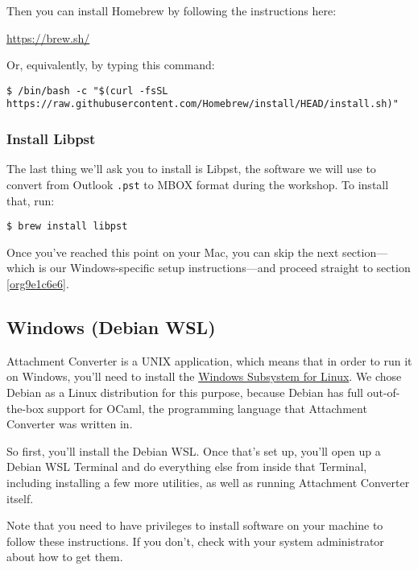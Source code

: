 \documentclass[11pt]{article}
\begin{document}
Then you can install Homebrew by following the instructions here:

\url{https://brew.sh/}

Or, equivalently, by typing this command:

\footnotesize

\begin{verbatim}
$ /bin/bash -c "$(curl -fsSL https://raw.githubusercontent.com/Homebrew/install/HEAD/install.sh)"
\end{verbatim}

\normalsize

\subsubsection{Install Libpst}
\label{sec:org3cbbe03}

The last thing we'll ask you to install is Libpst, the software we
will use to convert from Outlook \texttt{.pst} to MBOX format during the
workshop.  To install that, run:

\begin{verbatim}
$ brew install libpst
\end{verbatim}

Once you've reached this point on your Mac, you can skip the next
section---which is our Windows-specific setup instructions---and
proceed straight to section \ref{org9e1c6e6}.

\subsection{Windows (Debian WSL) \label{orge3954e9}}
\label{sec:orgbba2d81}

Attachment Converter is a UNIX application, which means that in order
to run it on Windows, you'll need to install the \href{https://en.wikipedia.org/wiki/Windows\_Subsystem\_for\_Linux}{Windows Subsystem for
Linux}.  We chose Debian as a Linux distribution for this purpose,
because Debian has full out-of-the-box support for OCaml, the
programming language that Attachment Converter was written in.

So first, you'll install the Debian WSL.  Once that's set up, you'll
open up a Debian WSL Terminal and do everything else from inside that
Terminal, including installing a few more utilities, as well as
running Attachment Converter itself.

Note that you need to have privileges to install software on your
machine to follow these instructions.  If you don't, check with your
system administrator about how to get them.
\end{document}
